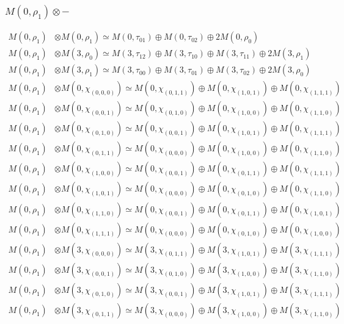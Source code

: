 \subsubsection{$ M(0,\rho_{1})\otimes -$}
\begin{align*}
M(0,\rho_{1}) &\otimes M(0,\rho_{1}) \simeq M(0,\tau_{01}) \oplus M(0,\tau_{02}) \oplus 2 M(0,\rho_{0}) \\
M(0,\rho_{1}) &\otimes M(3,\rho_{0}) \simeq M(3,\tau_{12}) \oplus M(3,\tau_{10}) \oplus M(3,\tau_{11}) \oplus 2 M(3,\rho_{1}) \\
M(0,\rho_{1}) &\otimes M(3,\rho_{1}) \simeq M(3,\tau_{00}) \oplus M(3,\tau_{01}) \oplus M(3,\tau_{02}) \oplus 2 M(3,\rho_{0}) \\
M(0,\rho_{1}) &\otimes M(0,\chi_{(0,0,0)}) \simeq M(0,\chi_{(0,1,1)}) \oplus M(0,\chi_{(1,0,1)}) \oplus M(0,\chi_{(1,1,1)}) \\
M(0,\rho_{1}) &\otimes M(0,\chi_{(0,0,1)}) \simeq M(0,\chi_{(0,1,0)}) \oplus M(0,\chi_{(1,0,0)}) \oplus M(0,\chi_{(1,1,0)}) \\
M(0,\rho_{1}) &\otimes M(0,\chi_{(0,1,0)}) \simeq M(0,\chi_{(0,0,1)}) \oplus M(0,\chi_{(1,0,1)}) \oplus M(0,\chi_{(1,1,1)}) \\
M(0,\rho_{1}) &\otimes M(0,\chi_{(0,1,1)}) \simeq M(0,\chi_{(0,0,0)}) \oplus M(0,\chi_{(1,0,0)}) \oplus M(0,\chi_{(1,1,0)}) \\
M(0,\rho_{1}) &\otimes M(0,\chi_{(1,0,0)}) \simeq M(0,\chi_{(0,0,1)}) \oplus M(0,\chi_{(0,1,1)}) \oplus M(0,\chi_{(1,1,1)}) \\
M(0,\rho_{1}) &\otimes M(0,\chi_{(1,0,1)}) \simeq M(0,\chi_{(0,0,0)}) \oplus M(0,\chi_{(0,1,0)}) \oplus M(0,\chi_{(1,1,0)}) \\
M(0,\rho_{1}) &\otimes M(0,\chi_{(1,1,0)}) \simeq M(0,\chi_{(0,0,1)}) \oplus M(0,\chi_{(0,1,1)}) \oplus M(0,\chi_{(1,0,1)}) \\
M(0,\rho_{1}) &\otimes M(0,\chi_{(1,1,1)}) \simeq M(0,\chi_{(0,0,0)}) \oplus M(0,\chi_{(0,1,0)}) \oplus M(0,\chi_{(1,0,0)}) \\
M(0,\rho_{1}) &\otimes M(3,\chi_{(0,0,0)}) \simeq M(3,\chi_{(0,1,1)}) \oplus M(3,\chi_{(1,0,1)}) \oplus M(3,\chi_{(1,1,1)}) \\
M(0,\rho_{1}) &\otimes M(3,\chi_{(0,0,1)}) \simeq M(3,\chi_{(0,1,0)}) \oplus M(3,\chi_{(1,0,0)}) \oplus M(3,\chi_{(1,1,0)}) \\
M(0,\rho_{1}) &\otimes M(3,\chi_{(0,1,0)}) \simeq M(3,\chi_{(0,0,1)}) \oplus M(3,\chi_{(1,0,1)}) \oplus M(3,\chi_{(1,1,1)}) \\
M(0,\rho_{1}) &\otimes M(3,\chi_{(0,1,1)}) \simeq M(3,\chi_{(0,0,0)}) \oplus M(3,\chi_{(1,0,0)}) \oplus M(3,\chi_{(1,1,0)}) \\

\end{align*}
